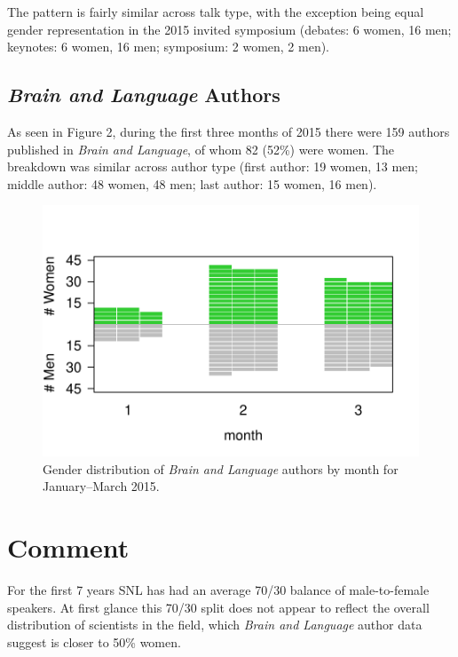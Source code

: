 \documentclass{winnower}
\begin{document}
The pattern is fairly similar across talk type, with the exception being equal gender representation in the 2015 invited symposium (debates: 6 women, 16 men; keynotes: 6 women, 16 men; symposium: 2 women, 2 men).



\subsection{{\itshape Brain and Language} Authors}

As seen in Figure 2, during the first three months of 2015 there were 159 authors published in {\itshape Brain and Language}, of whom 82 (52\%) were women. The breakdown was similar across author type (first author: 19 women, 13 men; middle author: 48 women, 48 men; last author: 15 women, 16 men).


\begin{figure}
\begin{center}
\includegraphics[scale=0.8]{BLauthorfigure.pdf}\vspace{0cm}
\caption
{Gender distribution of {\itshape Brain and Language} authors by month for January--March 2015.}
\label{figAuthors}
\end{center}
\end{figure}


\section{Comment}

For the first 7 years SNL has had an average 70/30 balance of male-to-female speakers. At first glance this 70/30 split does not appear to reflect the overall distribution of scientists in the field, which {\itshape Brain and Language} author data suggest is closer to 50\% women.
\end{document}
